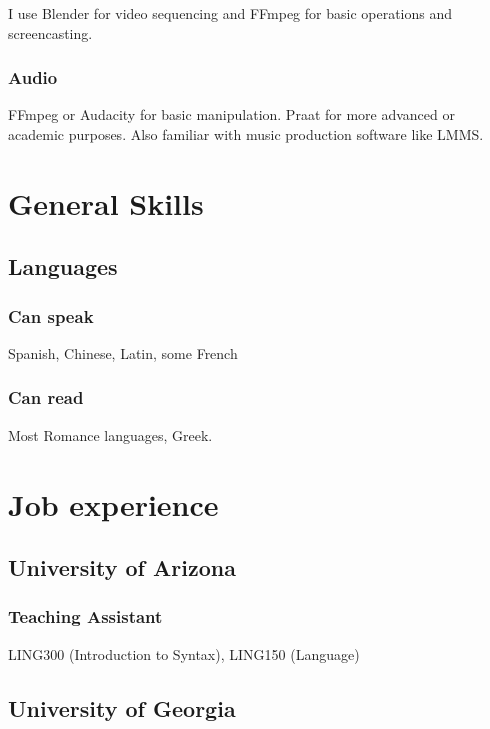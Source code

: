 \documentclass{article}
\begin{document}
I use Blender for video sequencing and FFmpeg for basic operations and screencasting.

\subsubsection{Audio}

FFmpeg or Audacity for basic manipulation. Praat for more advanced or academic purposes. Also familiar with music production software like LMMS.

\section{General Skills}

\subsection{Languages}

\subsubsection{Can speak}

Spanish, Chinese, Latin, some French

\subsubsection{Can read}

Most Romance languages, Greek.

\section{Job experience}

\subsection{University of Arizona}

\subsubsection{Teaching Assistant}

LING300 (Introduction to Syntax), LING150 (Language)

\subsection{University of Georgia}
\end{document}
